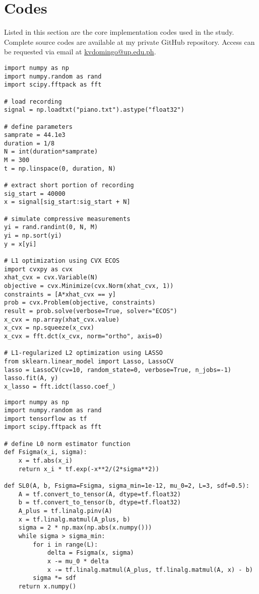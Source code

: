 \chapter{Codes}
\label{appendix:codes}

Listed in this section are the core implementation codes used in the study. Complete source codes are available at my private GitHub repository. Access can be requested via email at \url{kvdomingo@up.edu.ph}.

\singlespacing
{}


\begin{lstlisting}
import numpy as np
import numpy.random as rand
import scipy.fftpack as fft

# load recording
signal = np.loadtxt("piano.txt").astype("float32")

# define parameters
samprate = 44.1e3
duration = 1/8
N = int(duration*samprate)
M = 300
t = np.linspace(0, duration, N)

# extract short portion of recording
sig_start = 40000
x = signal[sig_start:sig_start + N]

# simulate compressive measurements
yi = rand.randint(0, N, M)
yi = np.sort(yi)
y = x[yi]

# L1 optimization using CVX ECOS
import cvxpy as cvx
xhat_cvx = cvx.Variable(N)
objective = cvx.Minimize(cvx.Norm(xhat_cvx, 1))
constraints = [A*xhat_cvx == y]
prob = cvx.Problem(objective, constraints)
result = prob.solve(verbose=True, solver="ECOS")
x_cvx = np.array(xhat_cvx.value)
x_cvx = np.squeeze(x_cvx)
x_cvx = fft.dct(x_cvx, norm="ortho", axis=0)

# L1-regularized L2 optimization using LASSO
from sklearn.linear_model import Lasso, LassoCV
lasso = LassoCV(cv=10, random_state=0, verbose=True, n_jobs=-1)
lasso.fit(A, y)
x_lasso = fft.idct(lasso.coef_)
\end{lstlisting}


\begin{lstlisting}
import numpy as np
import numpy.random as rand
import tensorflow as tf
import scipy.fftpack as fft

# define L0 norm estimator function
def Fsigma(x_i, sigma):
	x = tf.abs(x_i)
	return x_i * tf.exp(-x**2/(2*sigma**2))

def SL0(A, b, Fsigma=Fsigma, sigma_min=1e-12, mu_0=2, L=3, sdf=0.5):
	A = tf.convert_to_tensor(A, dtype=tf.float32)
	b = tf.convert_to_tensor(b, dtype=tf.float32)
	A_plus = tf.linalg.pinv(A)
	x = tf.linalg.matmul(A_plus, b)
	sigma = 2 * np.max(np.abs(x.numpy()))
	while sigma > sigma_min:
		for i in range(L):
			delta = Fsigma(x, sigma)
			x -= mu_0 * delta
			x -= tf.linalg.matmul(A_plus, tf.linalg.matmul(A, x) - b)
		sigma *= sdf
	return x.numpy()
\end{lstlisting}


